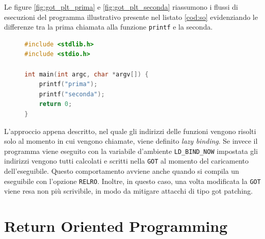 Le figure \ref{fig:got_plt_prima} e \ref{fig:got_plt_seconda}
riassumono i flussi di esecuzioni del programma illustrativo presente
nel listato \ref{cod:so} evidenziando le differenze tra la prima
chiamata alla funzione \lstinline{printf} e la seconda.

\begin{figure}
\begin{lstlisting}[language=c,label=cod:so,caption=codice del
    programma a cui fanno riferimento le figure
    \ref{fig:got_plt_prima} e \ref{fig:got_plt_seconda}]
#include <stdlib.h>
#include <stdio.h>

int main(int argc, char *argv[]) {
	printf("prima");
	printf("seconda");
	return 0;
}
\end{lstlisting}
\end{figure}

L'approccio appena descritto, nel quale gli indirizzi delle funzioni
vengono risolti solo al momento in cui vengono chiamate, viene
definito \emph{lazy binding}. Se invece il programma viene eseguito
con la variabile d'ambiente \lstinline{LD_BIND_NOW} impostata gli
indirizzi vengono tutti calcolati e scritti nella \lstinline{GOT} al
momento del caricamento dell'eseguibile. Questo comportamento avviene
anche quando si compila un eseguibile con l'opzione
\lstinline{RELRO}. Inoltre, in questo caso, una volta modificata la
\lstinline{GOT} viene resa non più scrivibile, in modo da mitigare
attacchi di tipo got patching.


\section{Return Oriented Programming}

